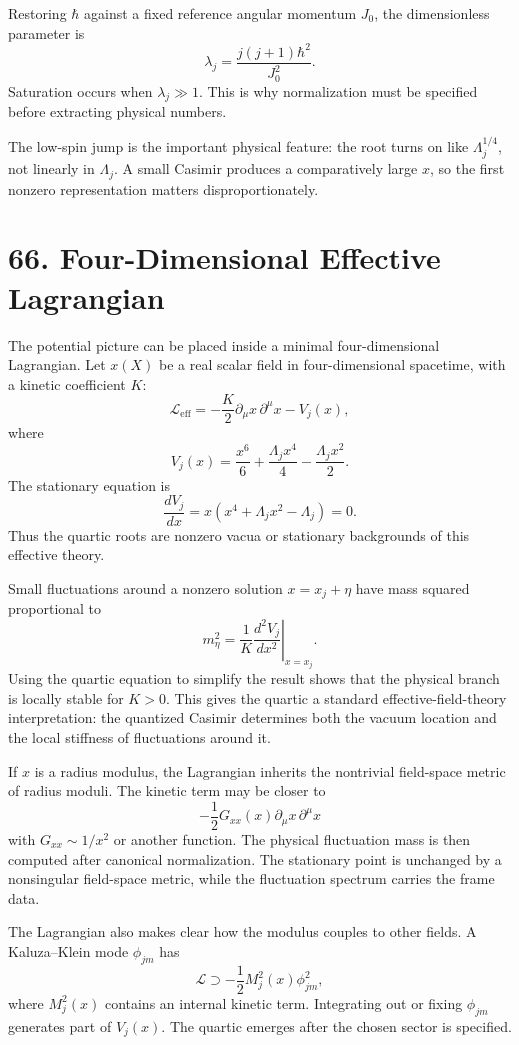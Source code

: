 \documentclass[11pt]{article}
\newcommand{\Lspin}{\Lambda_j}
\newcommand{\hb}{\hbar}
\begin{document}
Restoring \(\hb\) against a fixed reference angular momentum \(J_0\), the dimensionless parameter is
\[
        \lambda_j=\frac{j(j+1)\hb^2}{J_0^2}.
\]
Saturation occurs when \(\lambda_j\gg1\). This is why normalization must be specified before extracting physical numbers.

The low-spin jump is the important physical feature: the root turns on like \(\Lspin^{1/4}\), not linearly in \(\Lspin\). A small Casimir produces a comparatively large \(x\), so the first nonzero representation matters disproportionately.

\section*{66. Four-Dimensional Effective Lagrangian}

The potential picture can be placed inside a minimal four-dimensional Lagrangian. Let \(x(X)\) be a real scalar field in four-dimensional spacetime, with a kinetic coefficient \(K\):
\[
        \mathcal{L}_{\text{eff}}
        =
        -\frac{K}{2}\partial_\mu x\,\partial^\mu x
        -V_j(x),
\]
where
\[
        V_j(x)=
        \frac{x^6}{6}
        +\frac{\Lspin x^4}{4}
        -\frac{\Lspin x^2}{2}.
\]
The stationary equation is
\[
        \frac{dV_j}{dx}
        =
        x(x^4+\Lspin x^2-\Lspin)=0.
\]
Thus the quartic roots are nonzero vacua or stationary backgrounds of this effective theory.

Small fluctuations around a nonzero solution \(x=x_j+\eta\) have mass squared proportional to
\[
        m_\eta^2=
        \frac{1}{K}
        \left.
        \frac{d^2V_j}{dx^2}
        \right|_{x=x_j}.
\]
Using the quartic equation to simplify the result shows that the physical branch is locally stable for \(K>0\). This gives the quartic a standard effective-field-theory interpretation: the quantized Casimir determines both the vacuum location and the local stiffness of fluctuations around it.

If \(x\) is a radius modulus, the Lagrangian inherits the nontrivial field-space metric of radius moduli. The kinetic term may be closer to
\[
        -\frac12G_{xx}(x)\partial_\mu x\,\partial^\mu x
\]
with \(G_{xx}\sim 1/x^2\) or another function. The physical fluctuation mass is then computed after canonical normalization. The stationary point is unchanged by a nonsingular field-space metric, while the fluctuation spectrum carries the frame data.

The Lagrangian also makes clear how the modulus couples to other fields. A Kaluza--Klein mode \(\phi_{jm}\) has
\[
        \mathcal{L}\supset
        -\frac12M_j^2(x)\phi_{jm}^2,
\]
where \(M_j^2(x)\) contains an internal kinetic term. Integrating out or fixing \(\phi_{jm}\) generates part of \(V_j(x)\). The quartic emerges after the chosen sector is specified.
\end{document}
